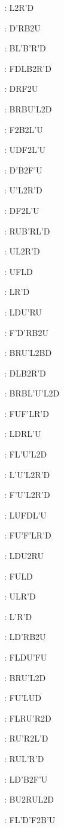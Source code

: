 \documentclass[9pt]{article}
\begin{document}
{\begin{multicols}{6}
: L2R'D

: D'RB2U

: BL'B'R'D

: FDLB2R'D

: DRF2U

: BRBU'L2D

: F2B2L'U

: UDF2L'U

: D'B2F'U

: U'L2R'D

: DF2L'U

: RUB'RL'D

: UL2R'D

: UFLD

: LR'D

: LDU'RU

: F'D'RB2U

: BRU'L2BD

: DLB2R'D

: BRBL'U'L2D

: FUF'LR'D

: LDRL'U

: FL'U'L2D

: L'U'L2R'D

: F'U'L2R'D

: LUFDL'U

: FU'F'LR'D

: LDU2RU

: FULD

: ULR'D

: L'R'D

: LD'RB2U

: FLDU'FU

: BRU'L2D

: FU'LUD

: FLRU'R2D

: RU'R2L'D

: RUL'R'D

: LD'B2F'U

: BU2RUL2D

: FL'D'F2B'U


\end{multicols}}
\end{document}
